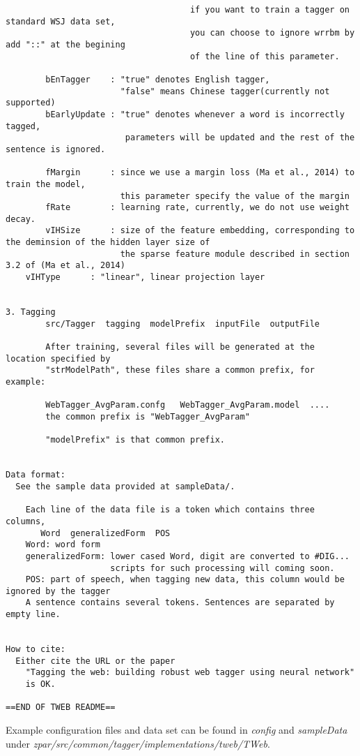 \documentclass[12pt]{article}
\begin{document}
\begin{CJK}{GBK}{song}
\begin{verbatim}
									 if you want to train a tagger on standard WSJ data set,
									 you can choose to ignore wrrbm by add "::" at the begining
									 of the line of this parameter.

		bEnTagger    : "true" denotes English tagger, 
		               "false" means Chinese tagger(currently not supported)
		bEarlyUpdate : "true" denotes whenever a word is incorrectly tagged,
		                parameters will be updated and the rest of the sentence is ignored.
		
		fMargin      : since we use a margin loss (Ma et al., 2014) to train the model, 
		               this parameter specify the value of the margin
		fRate        : learning rate, currently, we do not use weight decay.
		vIHSize      : size of the feature embedding, corresponding to the deminsion of the hidden layer size of
		               the sparse feature module described in section 3.2 of (Ma et al., 2014)
    vIHType      : "linear", linear projection layer


3. Tagging
		src/Tagger  tagging  modelPrefix  inputFile  outputFile
		
		After training, several files will be generated at the location specified by
		"strModelPath", these files share a common prefix, for example:
		
		WebTagger_AvgParam.confg   WebTagger_AvgParam.model  ....
		the common prefix is "WebTagger_AvgParam"

		"modelPrefix" is that common prefix.


Data format:
  See the sample data provided at sampleData/.

	Each line of the data file is a token which contains three columns, 
	   Word  generalizedForm  POS
	Word: word form
	generalizedForm: lower cased Word, digit are converted to #DIG...
	                 scripts for such processing will coming soon.
	POS: part of speech, when tagging new data, this column would be ignored by the tagger  
	A sentence contains several tokens.	Sentences are separated by empty line.
	

How to cite:
  Either cite the URL or the paper 
	"Tagging the web: building robust web tagger using neural network"
	is OK.

==END OF TWEB README==
\end{verbatim}

Example configuration files and data set can be found in \textit{config} and \textit{sampleData}
under \textit{zpar/src/common/tagger/implementations/tweb/TWeb}.


\end{CJK}
\end{document}
